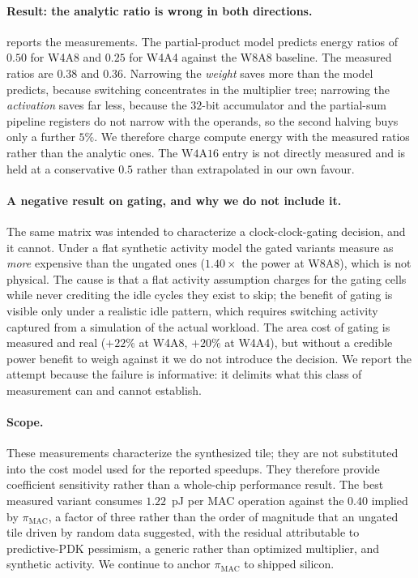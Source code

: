 \paragraph{Result: the analytic ratio is wrong in both directions.}
 reports the measurements.
The partial-product model predicts energy ratios of $0.50$ for W4A8 and $0.25$ for W4A4 against the W8A8 baseline.
The measured ratios are $0.38$ and $0.36$.
Narrowing the \emph{weight} saves more than the model predicts, because switching concentrates in the multiplier tree; narrowing the \emph{activation} saves far less, because the $32$-bit accumulator and the partial-sum pipeline registers do not narrow with the operands, so the second halving buys only a further $5\%$.
We therefore charge compute energy with the measured ratios rather than the analytic ones.
The $\mathrm{W4A16}$ entry is not directly measured and is held at a conservative $0.5$ rather than extrapolated in our own favour.

\paragraph{A negative result on gating, and why we do not include it.}
The same matrix was intended to characterize a clock-clock-gating decision, and it cannot.
Under a flat synthetic activity model the gated variants measure as \emph{more} expensive than the ungated ones ($1.40\times$ the power at W8A8), which is not physical.
The cause is that a flat activity assumption charges for the gating cells while never crediting the idle cycles they exist to skip; the benefit of gating is visible only under a realistic idle pattern, which requires switching activity captured from a simulation of the actual workload.
The area cost of gating is measured and real ($+22\%$ at W4A8, $+20\%$ at W4A4), but without a credible power benefit to weigh against it we do not introduce the decision.
We report the attempt because the failure is informative: it delimits what this class of measurement can and cannot establish.

\paragraph{Scope.}
These measurements characterize the synthesized tile; they are not substituted into the cost model used for the reported speedups.
They therefore provide coefficient sensitivity rather than a whole-chip performance result.
The best measured variant consumes $1.22$~pJ per MAC operation against the $0.40$ implied by $\pi_{\mathrm{MAC}}$, a factor of three rather than the order of magnitude that an ungated tile driven by random data suggested, with the residual attributable to predictive-PDK pessimism, a generic rather than optimized multiplier, and synthetic activity.
We continue to anchor $\pi_{\mathrm{MAC}}$ to shipped silicon.

